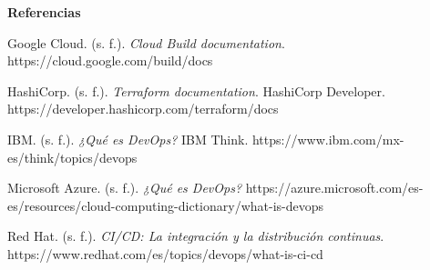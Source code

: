 \documentclass[11pt,a4paper]{article}
\begin{document}
\begin{center}
\textbf{Referencias}
\end{center}

\begin{flushleft}

\hangindent=1.27cm
\noindent Google Cloud. (s. f.). \emph{Cloud Build documentation}. https://cloud.google.com/build/docs

\medskip
\hangindent=1.27cm
\noindent HashiCorp. (s. f.). \emph{Terraform documentation}. HashiCorp Developer. https://developer.hashicorp.com/terraform/docs

\medskip
\hangindent=1.27cm
\noindent IBM. (s. f.). \emph{¿Qué es DevOps?} IBM Think. https://www.ibm.com/mx-es/think/topics/devops

\medskip
\hangindent=1.27cm
\noindent Microsoft Azure. (s. f.). \emph{¿Qué es DevOps?} https://azure.microsoft.com/es-es/resources/cloud-computing-dictionary/what-is-devops

\medskip
\hangindent=1.27cm
\noindent Red Hat. (s. f.). \emph{CI/CD: La integración y la distribución continuas}. https://www.redhat.com/es/topics/devops/what-is-ci-cd

\end{flushleft}
\end{document}
